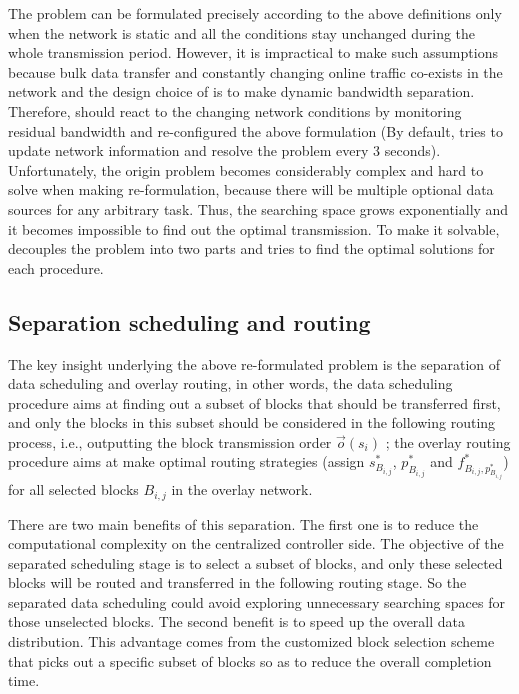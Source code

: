 The problem can be formulated precisely according to the above definitions only when the network is static and all the conditions stay unchanged during the whole transmission period. However, it is impractical to make such assumptions because bulk data transfer and constantly changing online traffic co-exists in the network and the design choice of \name is to make dynamic bandwidth separation. Therefore, \name should react to the changing network conditions by monitoring residual bandwidth and re-configured the above formulation (By default, \name tries to update network information and resolve the problem every 3 seconds). Unfortunately, the origin problem becomes considerably complex and hard to solve when making re-formulation, because there will be multiple optional data sources for any arbitrary task. Thus, the searching space grows exponentially and it becomes impossible to find out the optimal transmission. To make it solvable, \name decouples the problem into two parts and tries to find the optimal solutions for each procedure.

\subsection{Separation scheduling and routing}
\label{subsec:logic:separation}

The key insight underlying the above re-formulated problem is the separation of data scheduling and overlay routing, in other words, the data scheduling procedure aims at finding out a subset of blocks that should be transferred first, and only the blocks in this subset should be considered in the following routing process, i.e., outputting the block transmission order $\overrightarrow{o}(s_i)$ ; the overlay routing procedure aims at make optimal routing strategies (assign $s_{B_{i,j}}^*$, $p_{B_{i,j}}^*$ and $f^*_{B_{i,j},p_{B_{i,j}}^*}$) for all selected blocks $B_{i,j}$ in the overlay network.

There are two main benefits of this separation. The first one is to reduce the computational complexity on the centralized controller side. The objective of the separated scheduling stage is to select a subset of blocks, and only these selected blocks will be routed and transferred in the following routing stage. So the separated data scheduling could avoid exploring unnecessary searching spaces for those unselected blocks. The second benefit is to speed up the overall data distribution. This advantage comes from the customized block selection scheme that picks out a specific subset of blocks so as to reduce the overall completion time.

